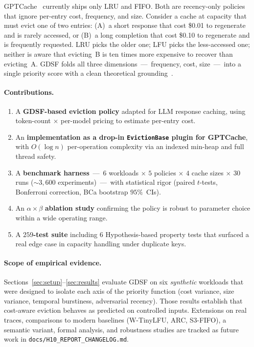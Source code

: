 \documentclass[sigconf, nonacm, review=false, screen=true]{acmart}
\begin{document}
GPTCache~\cite{gptcache} currently ships only LRU and FIFO. Both are
recency-only policies that ignore per-entry cost, frequency, and size.
Consider a cache at capacity that must evict one of two entries: (A)~a
short response that cost \$0.01 to regenerate and is rarely accessed, or
(B)~a long completion that cost \$0.10 to regenerate and is frequently
requested. LRU picks the older one; LFU picks the less-accessed one;
neither is aware that evicting~B is ten times more expensive to recover
than evicting~A. GDSF folds all three
dimensions~---~frequency, cost, size~---~into a single priority score with
a clean theoretical grounding~\cite{cherkasova1998gdsf, cao1997costaware}.

\paragraph{Contributions.}
\begin{enumerate}[leftmargin=1.4em]
  \item A \textbf{GDSF-based eviction policy} adapted for LLM response
        caching, using token-count $\times$ per-model pricing to estimate
        per-entry cost.
  \item An \textbf{implementation as a drop-in \texttt{EvictionBase}
        plugin for GPTCache}, with $O(\log n)$ per-operation complexity
        via an indexed min-heap and full thread safety.
  \item A \textbf{benchmark harness}~---~$6$ workloads
        $\times$ $5$ policies $\times$ $4$ cache sizes $\times$ $30$ runs
        ($\sim3{,}600$ experiments)~---~with statistical rigor
        (paired $t$-tests, Bonferroni correction, BCa bootstrap
        $95\%$~CIs).
  \item An $\alpha \times \beta$ \textbf{ablation study} confirming the
        policy is robust to parameter choice within a wide operating range.
  \item A \textbf{$259$-test suite} including $6$ Hypothesis-based property
        tests that surfaced a real edge case in capacity handling under
        duplicate keys.
\end{enumerate}

\paragraph{Scope of empirical evidence.}
Sections~\ref{sec:setup}--\ref{sec:results} evaluate GDSF on six
\emph{synthetic} workloads that were designed to isolate each axis of the
priority function (cost variance, size variance, temporal burstiness,
adversarial recency). Those results establish that cost-aware eviction
behaves as predicted on controlled inputs. Extensions on real traces,
comparisons to modern baselines (W-TinyLFU, ARC, S3-FIFO), a semantic
variant, formal analysis, and robustness studies are tracked as future
work in \texttt{docs/H10\_REPORT\_CHANGELOG.md}.
\end{document}
